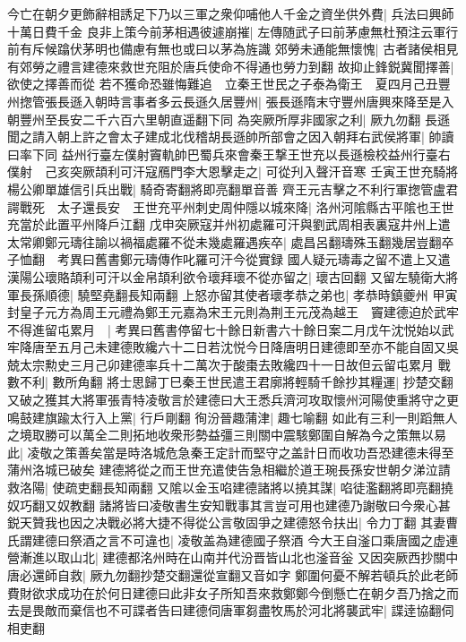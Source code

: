 今亡在朝夕更飾辭相誘足下乃以三軍之衆仰哺他人千金之資坐供外費|{
	兵法曰興師十萬日費千金}
良非上策今前茅相遇彼遽崩摧|{
	左傳随武子曰前茅慮無杜預注云軍行前有斥候蹹伏茅明也備慮有無也或曰以茅為旌識}
郊勞未通能無懷愧|{
	古者諸侯相見有郊勞之禮言建德來救世充阻於唐兵使命不得通也勞力到翻}
故抑止鋒鋭冀聞擇善|{
	欲使之擇善而從}
若不獲命恐雖悔難追　立秦王世民之子泰為衛王　夏四月己丑豐州揔管張長遜入朝時言事者多云長遜久居豐州|{
	張長遜隋末守豐州唐興來降至是入朝豐州至長安二千六百六里朝直遥翻下同}
為突厥所厚非國家之利|{
	厥九勿翻}
長遜聞之請入朝上許之會太子建成北伐稽胡長遜帥所部會之因入朝拜右武侯將軍|{
	帥讀曰率下同}
益州行臺左僕射竇軌帥巴蜀兵來會秦王撃王世充以長遜檢校益州行臺右僕射　己亥突厥頡利可汗寇鴈門李大恩擊走之|{
	可從刋入聲汗音寒}
壬寅王世充騎將楊公卿單雄信引兵出戰|{
	騎奇寄翻將即亮翻單音善}
齊王元吉擊之不利行軍揔管盧君諤戰死　太子還長安　王世充平州刺史周仲隱以城來降|{
	洛州河隂縣古平隂也王世充當於此置平州降戶江翻}
戊申突厥寇并州初處羅可汗與劉武周相表裏寇井州上遣太常卿鄭元璹往諭以禍福處羅不從未幾處羅遇疾卒|{
	處昌呂翻璹殊玉翻幾居豈翻卒子恤翻　考異曰舊書鄭元璹傳作叱羅可汗今從實録}
國人疑元璹毒之留不遣上又遣漢陽公瓌賂頡利可汗以金帛頡利欲令瓌拜瓌不從亦留之|{
	瓌古回翻}
又留左驍衛大將軍長孫順德|{
	驍堅堯翻長知兩翻}
上怒亦留其使者瓌孝恭之弟也|{
	孝恭時鎮夔州}
甲寅封皇子元方為周王元禮為鄭王元嘉為宋王元則為荆王元茂為越王　竇建德迫於武牢不得進留屯累月　|{
	考異曰舊書停留七十餘日新書六十餘日案二月戊午沈悦始以武牢降唐至五月己未建德敗纔六十二日若沈悦今日降唐明日建德即至亦不能自固又吳兢太宗勲史三月己卯建德率兵十二萬次于酸棗去敗纔四十一日故但云留屯累月}
戰數不利|{
	數所角翻}
將士思歸丁巳秦王世民遣王君廓將輕騎千餘抄其糧運|{
	抄楚交翻}
又破之獲其大將軍張青特凌敬言於建德曰大王悉兵濟河攻取懷州河陽使重將守之更鳴鼓建旗踰太行入上黨|{
	行戶剛翻}
徇汾晉趣蒲津|{
	趣七喻翻}
如此有三利一則蹈無人之境取勝可以萬全二則拓地收衆形勢益彊三則關中震駭鄭圍自解為今之策無以易此|{
	凌敬之策善矣當是時洛城危急秦王定計而堅守之盖計日而收功吾恐建德未得至蒲州洛城已破矣}
建德將從之而王世充遣使告急相繼於道王琬長孫安世朝夕涕泣請救洛陽|{
	使疏吏翻長知兩翻}
又隂以金玉啗建德諸將以撓其謀|{
	啗徒濫翻將即亮翻撓奴巧翻又奴教翻}
諸將皆曰凌敬書生安知戰事其言豈可用也建德乃謝敬曰今衆心甚鋭天贊我也因之决戰必將大捷不得從公言敬固爭之建德怒令扶出|{
	令力丁翻}
其妻曹氏謂建德曰祭酒之言不可違也|{
	凌敬盖為建德國子祭酒}
今大王自滏口乘唐國之虚連營漸進以取山北|{
	建德都洺州時在山南并代汾晋皆山北也滏音釡}
又因突厥西抄關中唐必還師自救|{
	厥九勿翻抄楚交翻還從宣翻又音如字}
鄭圍何憂不解若頓兵於此老師費財欲求成功在於何日建德曰此非女子所知吾來救鄭鄭今倒懸亡在朝夕吾乃捨之而去是畏敵而棄信也不可諜者告曰建德伺唐軍芻盡牧馬於河北將襲武牢|{
	諜逹協翻伺相吏翻}
